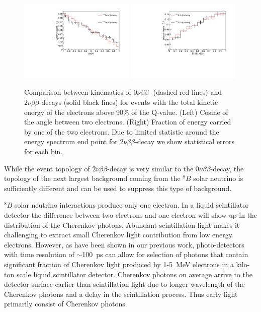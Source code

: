 \documentclass[12pt,twoside,letterpaper]{article}
\newcommand{\vbb}{0\nu\beta\beta}
\newcommand{\vvbb}{2\nu\beta\beta}
\newcommand{\B}{^{8}B}
\begin{document}
\begin{figure}[htb]
\centering
\includegraphics[angle=0,width=0.49\textwidth]{plots/hCos_Te130.pdf}
\includegraphics[angle=0,width=0.49\textwidth]{plots/hE1toQ_Te130.pdf}
\caption{Comparison between kinematics of $\vbb$- (dashed red lines) and $\vvbb$-decays (solid black lines) for events with the total kinetic energy of the electrons above 90\% of the Q-value. (Left) Cosine of the angle between two electrons. (Right) Fraction of energy carried by one of the two electrons. Due to limited statistic around the energy spectrum end point for $\vvbb$-decay we show statistical errors for each bin.}
\label{fig:Kinematics}
\end{figure}


While the event topology of $\vvbb$-decay is very similar to the $\vbb$-decay, the topology of the next largest background coming from the $\B$ solar neutrino is sufficiently different and can be used to suppress this type of background. 

$\B$ solar neutrino interactions produce only one electron. In a liquid scintillator detector the difference between two electrons and one electron will show up in the distribution of the Cherenkov photons. Abundant scintillation light makes it challenging to extract small Cherenkov light contribution from low energy electrons. However, as have been shown in our previous work, photo-detectors with time resolution of $\sim$100~ps can allow for selection of photons that contain significant fraction of Cherenkov light produced by 1-5~MeV electrons in a kilo-ton scale liquid scintillator detector. Cherenkov photons on average arrive to the detector surface earlier than scintillation light due to longer wavelength of the Cherenkov photons and a delay in the scintillation process. Thus early light primarily consist of Cherenkov photons.
\end{document}
